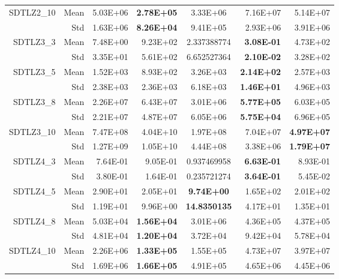 \begin{table*}[htbp]
\begin{tabular}{rrrrrrr}
    \multirow{2}[0]{*}{SDTLZ2\_10} & Mean  & 5.03E+06 & \textbf{2.78E+05} & \multicolumn{1}{c}{3.33E+06} & 7.16E+07 & 5.14E+07 \\
          & Std   & 1.63E+06 & \textbf{8.26E+04} & \multicolumn{1}{c}{9.41E+05} & 2.93E+06 & 3.91E+06 \\
    \multirow{2}[0]{*}{SDTLZ3\_3} & Mean  & 7.48E+00 & 9.23E+02 & \multicolumn{1}{c}{2.337388774} & \textbf{3.08E-01} & 4.73E+02 \\
          & Std   & 3.35E+01 & 5.61E+02 & \multicolumn{1}{c}{6.652527364} & \textbf{2.10E-02} & 3.28E+02 \\
    \multirow{2}[0]{*}{SDTLZ3\_5} & Mean  & 1.52E+03 & 8.93E+02 & \multicolumn{1}{c}{3.26E+03} & \textbf{2.14E+02} & 2.57E+03 \\
          & Std   & 2.38E+03 & 2.36E+03 & \multicolumn{1}{c}{6.18E+03} & \textbf{1.46E+01} & 4.96E+03 \\
    \multirow{2}[0]{*}{SDTLZ3\_8} & Mean  & 2.26E+07 & 6.43E+07 & \multicolumn{1}{c}{3.01E+06} & \textbf{5.77E+05} & 6.03E+05 \\
          & Std   & 2.21E+07 & 4.87E+07 & \multicolumn{1}{c}{6.05E+06} & \textbf{5.75E+04} & 6.96E+05 \\
    \multirow{2}[0]{*}{SDTLZ3\_10} & Mean  & 7.47E+08 & 4.04E+10 & \multicolumn{1}{c}{1.97E+08} & 7.04E+07 & \textbf{4.97E+07} \\
          & Std   & 1.27E+09 & 1.05E+10 & \multicolumn{1}{c}{4.44E+08} & 3.38E+06 & \textbf{1.79E+07} \\
    \multirow{2}[0]{*}{SDTLZ4\_3} & Mean  & 7.64E-01 & 9.05E-01 & \multicolumn{1}{c}{0.937469958} & \textbf{6.63E-01} & 8.93E-01 \\
          & Std   & 3.80E-01 & 1.64E-01 & \multicolumn{1}{c}{0.235721274} & \textbf{3.64E-01} & 5.45E-02 \\
    \multirow{2}[0]{*}{SDTLZ4\_5} & Mean  & 2.90E+01 & 2.05E+01 & \multicolumn{1}{c}{\textbf{9.74E+00}} & 1.65E+02 & 2.01E+02 \\
          & Std   & 1.19E+01 & 9.96E+00 & \multicolumn{1}{c}{\textbf{14.8350135}} & 4.17E+01 & 1.35E+01 \\
    \multirow{2}[0]{*}{SDTLZ4\_8} & Mean  & 5.03E+04 & \textbf{1.56E+04} & \multicolumn{1}{c}{3.01E+06} & 4.36E+05 & 4.37E+05 \\
          & Std   & 4.81E+04 & \textbf{1.20E+04} & \multicolumn{1}{c}{3.72E+04} & 9.42E+04 & 5.78E+04 \\
    \multirow{2}[0]{*}{SDTLZ4\_10} & Mean  & 2.26E+06 & \textbf{1.33E+05} & \multicolumn{1}{c}{1.55E+05} & 4.73E+07 & 3.97E+07 \\
          & Std   & 1.69E+06 & \textbf{1.66E+05} & \multicolumn{1}{c}{4.91E+05} & 4.65E+06 & 4.45E+06 \\
    \bottomrule
    \end{tabular}%
  \label{tab:SDTLZGD}%
\end{table*}%
